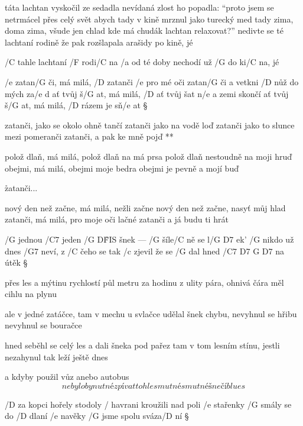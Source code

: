 \rr

táta lachtan vyskočil ze sedadla
nevídaná zlost ho popadla:
``proto jsem se netrmácel přes celý svět
abych tady v kině mrznul jako turecký med
tady zima, doma zima, všude jen chlad
kde má chudák lachtan relaxovat?''
nedivte se té lachtaní rodině
že pak rozšlapala arašidy po kině, jé

\rr

/C tahle lachtaní /F rodi/C na
/a od té doby nechodí už /G do ki/C na, jé




/e zatan/G či, má milá, /D zatanči /e pro mé oči
zatan/G či a vetkni /D nůž do mých za/e d
ať tvůj š/G at, má milá, /D ať tvůj šat n/e a zemi skončí
ať tvůj š/G at, má milá, /D rázem je sň/e at \S

\R  zatanči, jako se okolo ohně tančí
    zatanči jako na vodě loď
    zatanči jako to slunce mezi pomeranči
    zatanči, a pak ke mně pojď **

polož dlaň, má milá, polož dlaň na má prsa
polož dlaň nestoudně na moji hruď
obejmi, má milá, obejmi moje bedra
obejmi je pevně a mojí buď

\r zatanči...

nový den než začne, má milá, nežli začne
nový den než začne, nasyť můj hlad
zatanči, má milá, pro moje oči lačné
zatanči a já budu ti hrát

\rr




/G jednou /C7 jeden /{G D\^{FIS}} šnek --- /G šíle/C ně se l/{G D7} ek'
/G nikdo už dnes /G7 neví, z /C čeho se tak /c zjevil
že se /G dal hned /{C7 D7 G D7} na útěk \S

přes les a mýtinu rychlostí půl metru za hodinu
z ulity pára, ohnivá čára
měl cihlu na plynu \songgg

ale v jedné zatáčce, tam v mechu u svlačce
udělal šnek chybu, nevyhnul se hřibu
nevyhnul se bouračce \s

hned seběhl se celý les a dali šneka pod pařez
tam v tom lesním stínu, jestli nezahynul
tak leží ještě dnes \s

a kdyby použil vůz anebo autobus
\[ nebylo by nutné zpívat tohle smutné
   smutné šnečí blues \]




/D za kopci hořely stodoly
/ havrani kroužili nad poli
/e stařenky /G smály se do /D dlaní
/e navěky /G jsme spolu sváza/D ní \S

